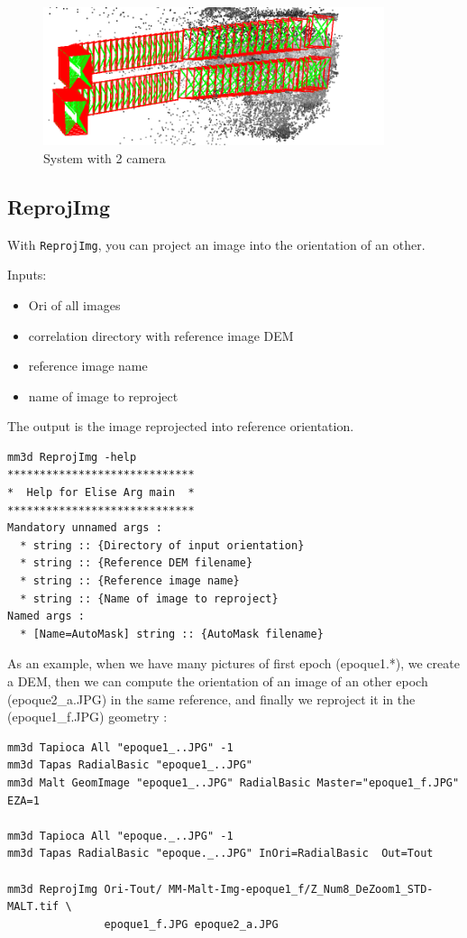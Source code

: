 \begin{figure}[H]
\centering
\includegraphics[width=10cm]{FIGS/InitOriLinear/InitAllImg2Turn01.png}
\caption{System with 2 camera}
\label{SurfCorr}
\end{figure}

\subsection{ReprojImg}

With {\tt ReprojImg}, you can project an image into the orientation of an other.

Inputs:
\begin{itemize}
\item Ori of all images
\item correlation directory with reference image DEM
\item reference image name
\item name of image to reproject
\end{itemize}

The output is the image reprojected into reference orientation.

\begin{verbatim}
mm3d ReprojImg -help
*****************************
*  Help for Elise Arg main  *
*****************************
Mandatory unnamed args : 
  * string :: {Directory of input orientation}
  * string :: {Reference DEM filename}
  * string :: {Reference image name}
  * string :: {Name of image to reproject}
Named args : 
  * [Name=AutoMask] string :: {AutoMask filename}
\end{verbatim}

As an example, when we have many pictures of first epoch (epoque1.*), we create a DEM,
then we can compute the orientation of an image of an other epoch (epoque2\_a.JPG) in the same reference,
and finally we reproject it in the (epoque1\_f.JPG) geometry :
\begin{verbatim}
mm3d Tapioca All "epoque1_..JPG" -1
mm3d Tapas RadialBasic "epoque1_..JPG"
mm3d Malt GeomImage "epoque1_..JPG" RadialBasic Master="epoque1_f.JPG" EZA=1

mm3d Tapioca All "epoque._..JPG" -1
mm3d Tapas RadialBasic "epoque._..JPG" InOri=RadialBasic  Out=Tout

mm3d ReprojImg Ori-Tout/ MM-Malt-Img-epoque1_f/Z_Num8_DeZoom1_STD-MALT.tif \
               epoque1_f.JPG epoque2_a.JPG
\end{verbatim}

